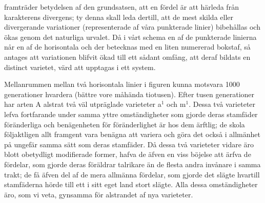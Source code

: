 framträder betydelsen af den grundsatsen, att en fördel är att härleda från karakterens divergens; ty denna skall leda dertill, att de mest skilda eller divergerande variationer (representerade af våra punkterade linier) bibehållas och ökas genom det naturliga urvalet. Då i vårt schema en af de punkterade linierna når en af de horisontala och der betecknas med en liten numererad bokstaf, så antages att variationen blifvit ökad till ett sådant omfång, att deraf bildats en distinct varietet, värd att upptagas i ett system.

Mellanrummen mellan två horisontala linier i figuren kunna motsvara 1000 generationer hvardera (bättre vore måhända tiotusen). Efter tusen generationer har arten A alstrat två väl utpräglade varieteter a${}^1$ och m${}^1$. Dessa två varieteter lefva fortfarande under samma yttre omständigheter som gjorde deras stamfäder föränderliga och benägenheten för föränderlighet är hos dem ärftlig; de skola följaktligen allt framgent vara benägna att variera och göra det också i allmänhet på ungefär samma sätt som deras stamfäder. Då dessa två varieteter vidare äro blott obetydligt modifierade former, hafva de äfven en viss böjelse att ärfva de fördelar, som gjorde deras föräldrar talrikare än de flesta andra invånare i samma trakt; de få äfven del af de mera allmänna fördelar, som gjorde det slägte hvartill stamfäderna hörde till ett i sitt eget land stort slägte. Alla dessa omständigheter äro, som vi veta, gynsamma för alstrandet af nya varieteter.


